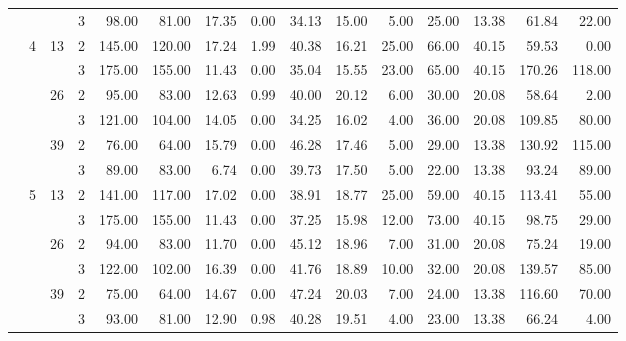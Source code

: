 \begin{tabular}{llllrrrrrrrrrrr}
               &   &    & 3 &    98.00 &     81.00 & 17.35 &    0.00 &   34.13 &   15.00 &    5.00 &   25.00 &   13.38 &  61.84 &    22.00 \\
\cline{2-15}
\cline{3-15}
               & \multirow{6}{*}{4} & \multirow{2}{*}{13} & 2 &   145.00 &    120.00 & 17.24 &    1.99 &   40.38 &   16.21 &   25.00 &   66.00 &   40.15 &  59.53 &     0.00 \\
               &   &    & 3 &   175.00 &    155.00 & 11.43 &    0.00 &   35.04 &   15.55 &   23.00 &   65.00 &   40.15 & 170.26 &   118.00 \\
\cline{3-15}
               &   & \multirow{2}{*}{26} & 2 &    95.00 &     83.00 & 12.63 &    0.99 &   40.00 &   20.12 &    6.00 &   30.00 &   20.08 &  58.64 &     2.00 \\
               &   &    & 3 &   121.00 &    104.00 & 14.05 &    0.00 &   34.25 &   16.02 &    4.00 &   36.00 &   20.08 & 109.85 &    80.00 \\
\cline{3-15}
               &   & \multirow{2}{*}{39} & 2 &    76.00 &     64.00 & 15.79 &    0.00 &   46.28 &   17.46 &    5.00 &   29.00 &   13.38 & 130.92 &   115.00 \\
               &   &    & 3 &    89.00 &     83.00 &  6.74 &    0.00 &   39.73 &   17.50 &    5.00 &   22.00 &   13.38 &  93.24 &    89.00 \\
\cline{2-15}
\cline{3-15}
               & \multirow{6}{*}{5} & \multirow{2}{*}{13} & 2 &   141.00 &    117.00 & 17.02 &    0.00 &   38.91 &   18.77 &   25.00 &   59.00 &   40.15 & 113.41 &    55.00 \\
               &   &    & 3 &   175.00 &    155.00 & 11.43 &    0.00 &   37.25 &   15.98 &   12.00 &   73.00 &   40.15 &  98.75 &    29.00 \\
\cline{3-15}
               &   & \multirow{2}{*}{26} & 2 &    94.00 &     83.00 & 11.70 &    0.00 &   45.12 &   18.96 &    7.00 &   31.00 &   20.08 &  75.24 &    19.00 \\
               &   &    & 3 &   122.00 &    102.00 & 16.39 &    0.00 &   41.76 &   18.89 &   10.00 &   32.00 &   20.08 & 139.57 &    85.00 \\
\cline{3-15}
               &   & \multirow{2}{*}{39} & 2 &    75.00 &     64.00 & 14.67 &    0.00 &   47.24 &   20.03 &    7.00 &   24.00 &   13.38 & 116.60 &    70.00 \\
               &   &    & 3 &    93.00 &     81.00 & 12.90 &    0.98 &   40.28 &   19.51 &    4.00 &   23.00 &   13.38 &  66.24 &     4.00 \\

\end{tabular}
